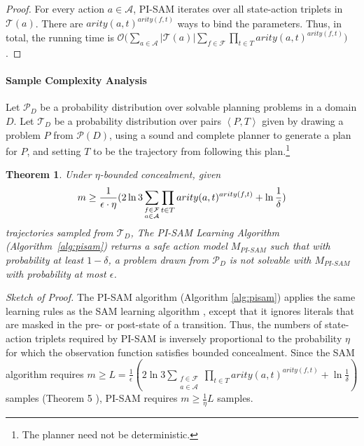 \documentclass[letterpaper]{article} %
\newtheorem{theorem}{Theorem}
\newcommand{\tuple}[1]{\ensuremath{\left \langle #1 \right \rangle }}
\newcommand{\pisam}{\textit{PI-SAM}\xspace}
\begin{document}
\begin{proof}
For every action $a\in \mathcal{A}$, PI-SAM iterates over all state-action triplets in $\mathcal{T}(a)$. There are $arity(a,t)^{arity(f,t)}$ ways to bind the parameters. 
Thus, in total, the running time is $\mathcal{O}\Big(\sum_{a\in \mathcal{A}}|\mathcal{T}(a)|\sum_{f\in\mathcal{F}}\prod_{t\in T}arity(a,t)^{arity(f,t)}\Big)$.
\end{proof}

\paragraph{Sample Complexity Analysis}

Let $\mathcal{P}_D$ be a probability distribution over solvable planning problems in a domain $D$. 
Let $\mathcal{T}_D$ be a probability distribution over pairs $\tuple{P, T}$ 
given by drawing a problem $P$ from $\mathcal{P}(D)$, 
using a sound and complete planner to generate a plan for $P$, 
and setting $T$ to be the trajectory from following this plan.\footnote{%
The planner need not be deterministic.}
\begin{theorem}\label{complexity-pisam-thm}
Under $\eta$-bounded concealment, given 
\begin{equation*}
    \small
m \geq \frac{1}{\epsilon \cdot\eta} (2\ln 3\sum_{\substack{f\in\mathcal{F}\\a\in\mathcal{A}}}\prod_{t\in T}arity(a,t)^{arity(f,t)} + \ln \frac{1}{\delta})
\end{equation*}
trajectories sampled from $\mathcal{T}_D$, 
The PI-SAM Learning Algorithm (Algorithm~\ref{alg:pisam}) returns a safe action model $M_\pisam$ such that with probability at least $1-\delta$, a problem drawn from $\mathcal{P}_D$ is not solvable with $M_\pisam$ with probability at most $\epsilon$.
\end{theorem}
\noindent
\emph{Sketch of Proof.} 
The PI-SAM algorithm (Algorithm \ref{alg:pisam}) applies the same learning rules as the SAM learning algorithm \cite{juba2021safe}, except that it ignores literals that are masked in the pre- or post-state of a transition. Thus, the numbers of state-action triplets required by PI-SAM is inversely proportional to the probability $\eta$ for which the observation function satisfies bounded concealment. 
Since the SAM algorithm requires $m \geq L = \frac{1}{\epsilon} (2\ln 3\sum_{\substack{f\in\mathcal{F}\\a\in\mathcal{A}}}\prod_{t\in T}arity(a,t)^{arity(f,t)} + \ln \frac{1}{\delta})$ samples (Theorem 5 \cite{juba2021safe}), PI-SAM requires $ m \geq \frac{1}{\eta}L$ samples. 
\end{document}
